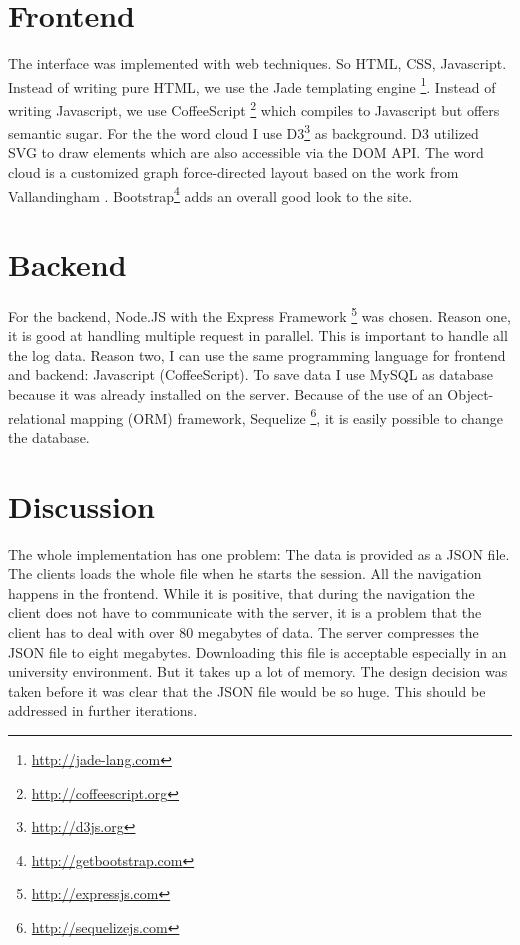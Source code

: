 \documentclass[11pt]{report}
\begin{document}
\section{Frontend}

The interface was implemented with web techniques. So HTML, CSS, Javascript. Instead of writing pure HTML, we use the Jade templating engine \footnote{\url{http://jade-lang.com}}. Instead of writing Javascript, we use CoffeeScript \footnote{\url{http://coffeescript.org}} which compiles to Javascript but offers semantic sugar. For the the word cloud I use D3\footnote{\url{http://d3js.org}} \cite{Bostock2011} as background. D3 utilized SVG to draw elements which are also accessible via the DOM API. The word cloud is a customized graph force-directed layout based on the work from Vallandingham \cite{Vallandingham}. Bootstrap\footnote{\url{http://getbootstrap.com}} adds an overall good look to the site.

\section{Backend}

For the backend, Node.JS with the Express Framework \footnote{\url{http://expressjs.com}} was chosen. Reason one, it is good at handling multiple request in parallel. This is important to handle all the log data. Reason two, I can use the same programming language for frontend and backend: Javascript (CoffeeScript). To save data I use MySQL as database because it was already installed on the server. Because of the use of an Object-relational mapping (ORM) framework, Sequelize \footnote{\url{http://sequelizejs.com}}, it is easily possible to change the database.

\section{Discussion}

The whole implementation has one problem: The data is provided as a JSON file. The clients loads the whole file when he starts the session. All the navigation happens in the frontend. While it is positive, that during the navigation the client does not have to communicate with the server, it is a problem that the client has to deal with over 80 megabytes of data. The server compresses the JSON file to eight megabytes. Downloading this file is acceptable especially in an university environment. But it takes up a lot of memory. The design decision was taken before it was clear that the JSON file would be so huge. This should be addressed in further iterations. \\
\end{document}
